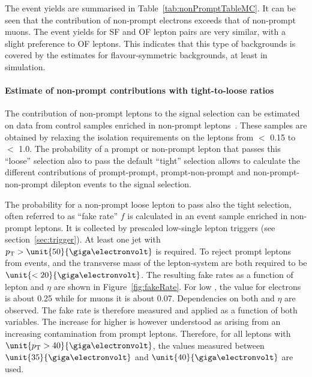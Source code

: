 The event yields are summarised in Table~\ref{tab:nonPromptTableMC}. It can be seen that the contribution of non-prompt electrons exceeds that of non-prompt muons. The event yields for SF and OF lepton pairs are very similar, with a slight preference to OF leptons. This indicates that this type of backgrounds is covered by the estimates for flavour-symmetric backgrounds, at least in simulation.


\paragraph*{Estimate of non-prompt contributions with tight-to-loose ratios}
The contribution of non-prompt leptons to the signal selection can be estimated on data from control samples enriched in non-prompt leptons~\cite{fakesnote1,fakesnote2}. These samples are obtained by relaxing the isolation requirements on the leptons from $<$ 0.15 to $<$ 1.0. The probability of a prompt or non-prompt lepton that passes this ``loose'' selection also to pass the default ``tight'' selection allows to calculate the different contributions of prompt-prompt, prompt-non-prompt and non-prompt-non-prompt dilepton events to the signal selection. 

The probability for a non-prompt loose lepton to pass also the tight selection, often referred to as ``fake rate'' $f$ is calculated in an event sample enriched in non-prompt leptons. It is collected by prescaled low-\pt single lepton triggers (see section~\ref{sec:trigger}). At least one jet with $\pt > \unit{50}{\giga\electronvolt}$ is required. To reject prompt leptons from \Wjets events, \MET and the transverse mass of the lepton-\MET system are both required to be $\unit{<20}{\giga\electronvolt}$. The resulting fake rates as a function of lepton \pt and $\eta$ are shown in Figure~\ref{fig:fakeRate}. For low \pt, the value for electrons is about 0.25 while for muons it is about 0.07. Dependencies on both \pt and $\eta$ are observed. The fake rate is therefore measured and applied as a function of both variables. The increase for higher \pt is however understood as arising from an increasing contamination from prompt leptons. Therefore, for all leptons with $\unit{\pt > 40}{\giga\electronvolt}$, the values measured between $\unit{35}{\giga\electronvolt}$ and $\unit{40}{\giga\electronvolt}$ are used.  

